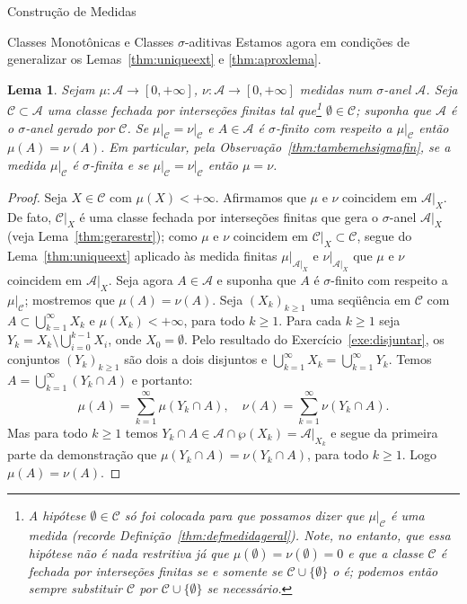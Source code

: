 \documentclass[oneside,final,11pt]{amsbook}
\theoremstyle{remark}\newtheorem{exercise}{Exercício}[chapter]
\theoremstyle{remark}\newtheorem{*exercise}[exercise]{\hbox to 0pt{\hskip 0pt minus 1fil*}Exercício}
\theoremstyle{definition}\newtheorem{exdefin}{Definição}[chapter]
\theoremstyle{plain}\newtheorem{teo}{Teorema}[section]
\theoremstyle{plain}\newtheorem{lem}[teo]{Lema}
\theoremstyle{plain}\newtheorem{prop}[teo]{Proposição}
\theoremstyle{plain}\newtheorem{cor}[teo]{Corolário}
\theoremstyle{definition}\newtheorem{defin}[teo]{Definição}
\theoremstyle{remark}\newtheorem{rem}[teo]{Observação}
\theoremstyle{definition}\newtheorem{notation}[teo]{Notação}
\theoremstyle{definition}\newtheorem{convention}[teo]{Convenção}
\theoremstyle{definition}\newtheorem{example}[teo]{Exemplo}
\numberwithin{section}{chapter}
\numberwithin{equation}{section}
\begin{document}
\begin{chapter}{Construção de Medidas}
\begin{section}{Classes Monotônicas e Classes ${\sigma}$-aditivas}
Estamos agora em condições de generalizar os Lemas~\ref{thm:uniqueext} e \ref{thm:aproxlema}.
\begin{lem}\label{thm:sigmauniqueext}
Sejam $\mu:\mathcal A\to[0,+\infty]$, $\nu:\mathcal A\to[0,+\infty]$
medidas num $\sigma$-anel $\mathcal A$. Seja $\mathcal C\subset\mathcal A$
uma classe fechada por interseções finitas tal que\footnote{%
A\label{foot:sigmauniqueext} hipótese $\emptyset\in\mathcal C$ só foi colocada para que possamos dizer que
$\mu\vert_{\mathcal C}$ é uma medida (recorde Definição~\ref{thm:defmedidageral}).
Note, no entanto, que essa hipótese não é nada restritiva
já que $\mu(\emptyset)=\nu(\emptyset)=0$ e que a classe $\mathcal C$ é fechada por interseções finitas
se e somente se $\mathcal C\cup\{\emptyset\}$ o é; podemos então sempre
substituir $\mathcal C$ por $\mathcal C\cup\{\emptyset\}$ se necessário.}
$\emptyset\in\mathcal C$;
suponha que $\mathcal A$ é o $\sigma$-anel
gerado por $\mathcal C$. Se $\mu\vert_{\mathcal C}=\nu\vert_{\mathcal C}$
e $A\in\mathcal A$ é $\sigma$-finito com respeito a $\mu\vert_{\mathcal C}$
então $\mu(A)=\nu(A)$. Em particular, pela Observação~\ref{thm:tambemehsigmafin},
se a medida $\mu\vert_{\mathcal C}$ é $\sigma$-finita
e se $\mu\vert_{\mathcal C}=\nu\vert_{\mathcal C}$ então $\mu=\nu$.
\end{lem}
\begin{proof}
Seja $X\in\mathcal C$ com $\mu(X)<+\infty$. Afirmamos que $\mu$ e $\nu$ coincidem
em $\mathcal A\vert_X$. De fato, $\mathcal C\vert_X$ é uma classe fechada por interseções
finitas que gera o $\sigma$-anel $\mathcal A\vert_X$ (veja Lema~\ref{thm:gerarestr});
como $\mu$ e $\nu$ coincidem em $\mathcal C\vert_X\subset\mathcal C$,
segue do Lema~\ref{thm:uniqueext} aplicado às medida finitas $\mu\vert_{\mathcal A\vert_X}$
e $\nu\vert_{\mathcal A\vert_X}$ que $\mu$ e $\nu$ coincidem em $\mathcal A\vert_X$.
Seja agora $A\in\mathcal A$ e suponha que $A$ é $\sigma$-finito com respeito a $\mu\vert_{\mathcal C}$;
mostremos que $\mu(A)=\nu(A)$. Seja $(X_k)_{k\ge1}$ uma seqüência em $\mathcal C$ com $A\subset\bigcup_{k=1}^\infty X_k$
e $\mu(X_k)<+\infty$, para todo $k\ge1$. Para cada $k\ge1$ seja
$Y_k=X_k\setminus\bigcup_{i=0}^{k-1}X_i$, onde $X_0=\emptyset$. Pelo resultado
do Exercício~\ref{exe:disjuntar}, os conjuntos $(Y_k)_{k\ge1}$ são dois a dois disjuntos
e $\bigcup_{k=1}^\infty X_k=\bigcup_{k=1}^\infty Y_k$. Temos
$A=\bigcup_{k=1}^\infty(Y_k\cap A)$ e portanto:
\[\mu(A)=\sum_{k=1}^\infty\mu(Y_k\cap A),\quad\nu(A)=\sum_{k=1}^\infty\nu(Y_k\cap A).\]
Mas para todo $k\ge1$ temos $Y_k\cap A\in\mathcal A\cap\wp(X_k)=\mathcal A\vert_{X_k}$
e segue da primeira parte da demonstração que $\mu(Y_k\cap A)=\nu(Y_k\cap A)$, para todo
$k\ge1$. Logo $\mu(A)=\nu(A)$.
\end{proof}


\end{section}
\end{chapter}
\end{document}
